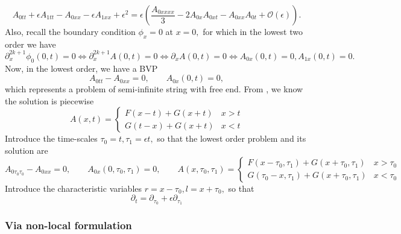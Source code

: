 \documentclass[10pt,reqno,oneside,a4paper]{article}
\begin{document}
\[  
A_{0tt} + \epsilon A_{1tt} - A_{0xx}  - \epsilon A_{1xx} + \mathcal{\epsilon^2} = \epsilon \left( \frac{A_{0xxxx}}{3} - 2 A_{0x}A_{0xt} - A_{0xx}A_{0t} + \mathcal{O}(\epsilon)\right).
\]
Also, recall the boundary condition $\phi_x = 0$ at $x = 0,$ for which in the lowest two order we have 
\[ 
\partial_x^{2k+1}\phi_0(0,t) = 0 \iff \partial_x^{2k+1}A(0,t) = 0 \iff \partial_xA(0,t) = 0 \iff  A_{0x}(0,t) = 0, A_{1x}(0,t) = 0.
\]
Now, in the lowest order, we have a BVP
\[ 
A_{0tt} - A_{0xx} = 0, \qquad A_{0x}(0,t) = 0,
\]
which represents a problem of semi-infinite string with free end. From \cite[Chapter 9, p.64-65]{knobel}, we know the solution is piecewise
\[ 
A(x,t) = \begin{cases} F(x-t) +G(x + t) & x>t  \\ G(t- x) + G(x+t) & x<t \end{cases}
\]
Introduce the time-scales $\tau_0 = t, \tau_1 = \epsilon t,$ so that the lowest order problem and its solution are
\[ 
A_{0\tau_0\tau_0} - A_{0xx} = 0, \qquad A_{0x}(0,\tau_0, \tau_1) = 0, \qquad A(x,\tau_0, \tau_1) = \begin{cases} F(x-\tau_0, \tau_1) +G(x + \tau_0, \tau_1) & x>\tau_0  \\ G(\tau_0- x, \tau_1) + G(x+\tau_0, \tau_1) & x<\tau_0 \end{cases}
\] 
Introduce the characteristic variables $r =x - \tau_0, l = x + \tau_0,$ so that
\[ 
\partial_{t} = \partial_{\tau_0}+ \epsilon \partial_{\tau_1}
\]


\subsubsection{Via non-local formulation}


{\small}
\end{document}
